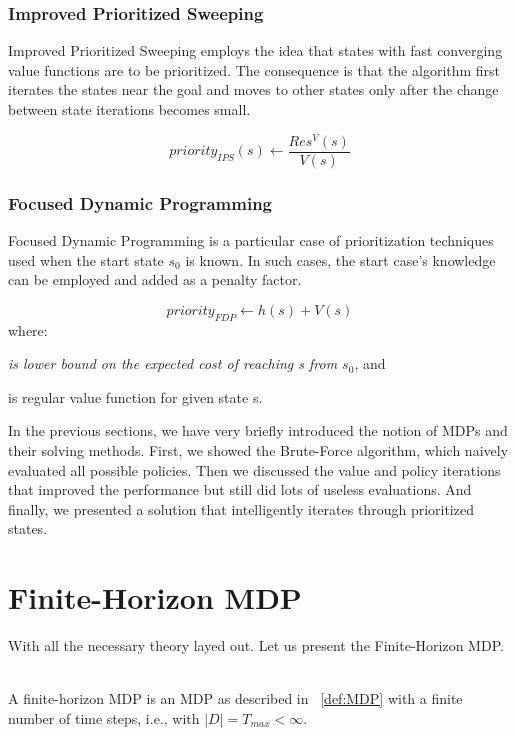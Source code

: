 \subsubsection{Improved Prioritized Sweeping}

Improved Prioritized Sweeping employs the idea that states with fast converging value functions are to be prioritized. The consequence is that the algorithm first iterates the states near the goal and moves to other states only after the change between state iterations becomes small.

$$priority_{IPS} (s) \xleftarrow{} \frac{Res^{V} (s)}{V (s)} $$

\subsubsection{Focused Dynamic Programming}

Focused Dynamic Programming is a particular case of prioritization techniques used when the start state $s_0$ is known. In such cases, the start case's knowledge can be employed and added as a penalty factor.

$$priority_{FDP} \xleftarrow{} h(s) + V(s)$$
where:
\begin{description}[1cm]
  \item[h(s)] \textit{is lower bound on the expected cost of reaching s from $s_0$}, and
  \item[V(s)] is regular value function for given state s.
\end{description}

In the previous sections, we have very briefly introduced the notion of MDPs and their solving methods. First, we showed the Brute-Force algorithm, which naively evaluated all possible policies. Then we discussed the value and policy iterations that improved the performance but still did lots of useless evaluations. And finally, we presented a solution that intelligently iterates through prioritized states. 

\section{Finite-Horizon MDP}

With all the necessary theory layed out. Let us present the Finite-Horizon MDP.\\ \\

\begin{definition}
A finite-horizon MDP is an MDP as described in ~\ref{def:MDP} with a finite number of time steps, i.e., with $|D| = T_{max} < \infty$.
\end{definition}


